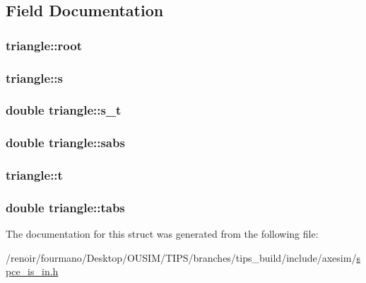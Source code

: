 \subsection{Field Documentation}
\hypertarget{structtriangle_a0c5a2697ad4499cee584e11dc94ef48e}{
\subsubsection[{root}]{ {\bf triangle::root}}}
\label{structtriangle_a0c5a2697ad4499cee584e11dc94ef48e}
\hypertarget{structtriangle_adb4c4c0952d90abc37c9007239c9749e}{
\subsubsection[{s}]{ {\bf triangle::s}}}
\label{structtriangle_adb4c4c0952d90abc37c9007239c9749e}
\hypertarget{structtriangle_a85745d45cfb20177d5f41d9deaf29d74}{
\subsubsection[{s\_\-t}]{\setlength{\rightskip}{0pt plus 5cm}double {\bf triangle::s\_\-t}}}
\label{structtriangle_a85745d45cfb20177d5f41d9deaf29d74}
\hypertarget{structtriangle_a623fb1a6ba02daa89ef261704904e35e}{
\subsubsection[{sabs}]{\setlength{\rightskip}{0pt plus 5cm}double {\bf triangle::sabs}}}
\label{structtriangle_a623fb1a6ba02daa89ef261704904e35e}
\hypertarget{structtriangle_adaa3bc970f5fb00d8e7f5fa0cff15c9c}{
\subsubsection[{t}]{ {\bf triangle::t}}}
\label{structtriangle_adaa3bc970f5fb00d8e7f5fa0cff15c9c}
\hypertarget{structtriangle_a9847876d54795168060857aeeaec7cca}{
\subsubsection[{tabs}]{\setlength{\rightskip}{0pt plus 5cm}double {\bf triangle::tabs}}}
\label{structtriangle_a9847876d54795168060857aeeaec7cca}


The documentation for this struct was generated from the following file:\begin{DoxyCompactItemize}
\item 
/renoir/fourmano/Desktop/OUSIM/TIPS/branches/tips\_\-build/include/axesim/\hyperlink{spce__is__in_8h}{spce\_\-is\_\-in.h}\end{DoxyCompactItemize}
